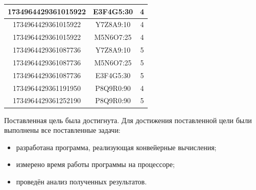 \begin{table}[h]
\begin{tabular}{| c | c | c |}
		1734964429361015922 & E3F4G5:30 & 4 \\\hline
		1734964429361015922 & Y7Z8A9:10 & 4 \\\hline		
		1734964429361015922 & M5N6O7:25 & 4 \\\hline
		1734964429361087736 & Y7Z8A9:10 & 5 \\\hline
		1734964429361087736 & M5N6O7:25 & 5 \\\hline
		1734964429361087736 & E3F4G5:30 & 5 \\\hline
		1734964429361191950 & P8Q9R0:90 & 4 \\\hline
		1734964429361252190 & P8Q9R0:90 & 5 \\\hline
	\end{tabular}
\end{table}


Поставленная цель была достигнута.
Для достижения поставленной цели были выполнены все поставленные задачи:
\begin{itemize}[label=---]
	\item разработана программа, реализующая конвейерные вычисления;
	\item измерено время работы программы на процессоре;
	\item проведён анализ полученных результатов.
\end{itemize}

